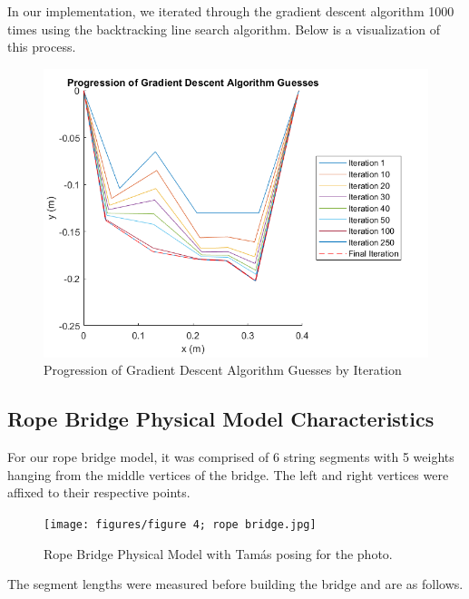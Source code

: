\documentclass[10pt,letterpaper,onecolumn,report]{tau-class/tau}
\begin{document}
        In our implementation, we iterated through the gradient descent algorithm 1000 times using the backtracking line search algorithm. Below is a visualization of this process.

        \begin{figure}[H]
            \centering
            \setcounter{figure}{4} %
            \includegraphics[width=0.5\linewidth]{figures/figure 5; gradient descent progression.png}
            \caption{Progression of Gradient Descent Algorithm Guesses by Iteration}
            \label{fig:enter-label}
        \end{figure}

    \subsection{Rope Bridge Physical Model Characteristics}

        For our rope bridge model, it was comprised of 6 string segments with 5 weights hanging from the middle vertices of the bridge. The left and right vertices were affixed to their respective points.

        \begin{figure}
            \centering
            \texttt{[image: figures/figure 4; rope bridge.jpg]}
            \caption{Rope Bridge Physical Model with Tamás posing for the photo.}
            \label{fig:enter-label}
        \end{figure}

        The segment lengths were measured before building the bridge and are as follows.
        
\end{document}
